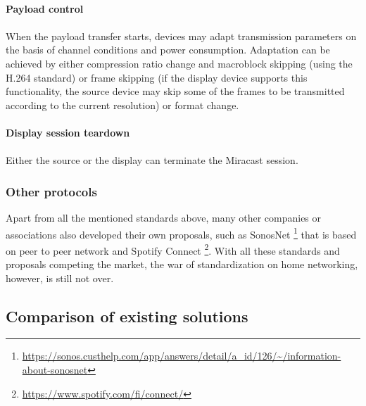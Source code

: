 \\
\textbf{Payload control}\\
\\
When the payload transfer starts, devices may adapt transmission parameters on
the basis of channel conditions and power consumption. Adaptation can be achieved by either compression ratio change and macroblock skipping (using the H.264 standard) or frame skipping (if the display device supports this functionality, the source device may skip some of the frames to be transmitted according to the current resolution) or format change. \\
\\ 
\textbf{Display session teardown} \\
\\
Either the source or the display can terminate the Miracast session.
\subsubsection{Other protocols}
Apart from all the mentioned standards above, many other companies or associations 
also developed their own proposals, such as SonosNet \cite{sonosnet}
\footnote{\url{https://sonos.custhelp.com/app/answers/detail/a_id/126/~/information-about-sonosnet}}
that is based on peer to peer network and Spotify Connect \cite{spotifyconnect}
\footnote{\url{https://www.spotify.com/fi/connect/}}. With all these standards
and proposals competing the market, the war of standardization on home networking, however, is still not over.

\subsection{Comparison of existing solutions} 
